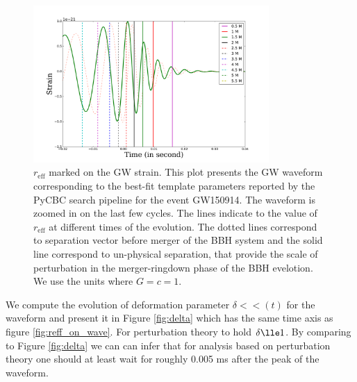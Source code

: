 \begin{figure}
\centering
\includegraphics[width=0.8\textwidth]{figures/reffmarking.pdf}
\caption{$r_{\mathrm{eff}}$ marked on the GW strain. This plot presents the GW waveform corresponding to the best-fit template parameters reported by the PyCBC search pipeline for the event GW150914. The  waveform is zoomed in on the last few cycles. The lines indicate to the value of $r_{\mathrm{eff}}$ at different times of the evolution. The dotted lines correspond to separation vector before merger of the BBH system and the solid line correspond to un-physical separation, that provide the scale of perturbation in the merger-ringdown phase of the BBH evelotion. We use the units where $G = c = 1$. }
\label{fiig:reff_on_wave}
\end{figure}

We compute the evolution of deformation parameter $\delta << (t)$ for the waveform and present it in Figure \ref{fig:delta} which has the same time axis as figure \ref{fig:reff_on_wave}. For perturbation theory to hold $\delta \lle 1$. By comparing to Figure \ref{fig:delta} we can can infer that for analysis based on perturbation theory one should at least wait for roughly 0.005 ms after the peak of the waveform.  

